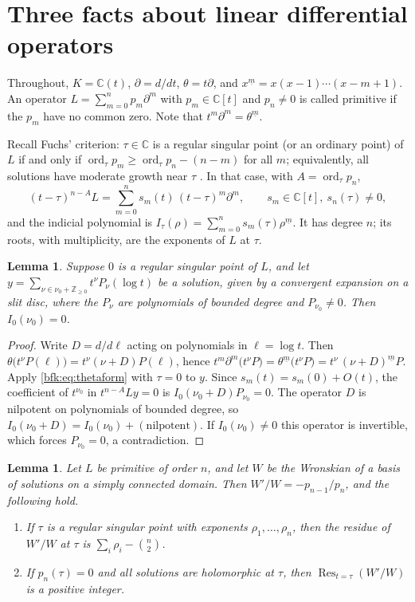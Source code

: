 \documentclass[11pt,a4paper]{article}
\newtheorem{lemma}[theorem]{Lemma}
\theoremstyle{definition}
\theoremstyle{remark}
\numberwithin{equation}{section}
\newcommand{\C}{\mathbb{C}}
\newcommand{\Z}{\mathbb{Z}}
\newcommand{\ff}[2]{#1^{\underline{#2}}}
\DeclareMathOperator{\ord}{ord}
\DeclareMathOperator{\Res}{Res}
\begin{document}
\section{Three facts about linear differential operators}\label{bfk:sec:ode}

Throughout, $K=\C(t)$, $\partial=d/dt$, $\theta=t\partial$, and $\ff{x}{m}=x(x-1)\cdots(x-m+1)$. An operator $L=\sum_{m=0}^{n}p_m\partial^m$ with $p_m\in\C[t]$ and $p_n\ne0$ is called primitive if the $p_m$ have no common zero. Note that $t^m\partial^m=\ff{\theta}{m}$.

Recall Fuchs' criterion: $\tau\in\C$ is a regular singular point (or an ordinary point) of $L$ if and only if $\ord_\tau p_m\ge \ord_\tau p_n-(n-m)$ for all $m$; equivalently, all solutions have moderate growth near $\tau$ \cite{Inc56,Was65}. In that case, with $A=\ord_\tau p_n$,
\begin{equation}\label{bfk:eq:thetaform}
(t-\tau)^{n-A}L=\sum_{m=0}^{n}s_m(t)\,(t-\tau)^m\partial^m,\qquad s_m\in\C[t],\ s_n(\tau)\ne0,
\end{equation}
and the indicial polynomial is $I_\tau(\rho)=\sum_{m=0}^{n}s_m(\tau)\ff{\rho}{m}$. It has degree $n$; its roots, with multiplicity, are the exponents of $L$ at $\tau$.

\begin{lemma}\label{bfk:lem:indicial}
Suppose $0$ is a regular singular point of $L$, and let $y=\sum_{\nu\in\nu_0+\Z_{\ge0}}t^{\nu}P_\nu(\log t)$ be a solution, given by a convergent expansion on a slit disc, where the $P_\nu$ are polynomials of bounded degree and $P_{\nu_0}\ne 0$. Then $I_0(\nu_0)=0$.
\end{lemma}

\begin{proof}
Write $D=d/d\ell$ acting on polynomials in $\ell=\log t$. Then $\theta\bigl(t^\nu P(\ell)\bigr)=t^\nu(\nu+D)P(\ell)$, hence $t^m\partial^m\bigl(t^\nu P\bigr)=\ff{\theta}{m}\bigl(t^\nu P\bigr)=t^\nu\,\ff{(\nu+D)}{m}P$. Apply \eqref{bfk:eq:thetaform} with $\tau=0$ to $y$. Since $s_m(t)=s_m(0)+O(t)$, the coefficient of $t^{\nu_0}$ in $t^{n-A}Ly=0$ is $I_0(\nu_0+D)P_{\nu_0}=0$. The operator $D$ is nilpotent on polynomials of bounded degree, so $I_0(\nu_0+D)=I_0(\nu_0)+(\text{nilpotent})$. If $I_0(\nu_0)\ne0$ this operator is invertible, which forces $P_{\nu_0}=0$, a contradiction.
\end{proof}

\begin{lemma}\label{bfk:lem:abel}
Let $L$ be primitive of order $n$, and let $W$ be the Wronskian of a basis of solutions on a simply connected domain. Then $W'/W=-p_{n-1}/p_n$, and the following hold.
\begin{enumerate}
\item[(a)] If $\tau$ is a regular singular point with exponents $\rho_1,\dots,\rho_n$, then the residue of $W'/W$ at $\tau$ is $\sum_i\rho_i-\binom n2$.
\item[(b)] If $p_n(\tau)=0$ and all solutions are holomorphic at $\tau$, then $\Res_{t=\tau}(W'/W)$ is a positive integer.
\end{enumerate}
\end{lemma}
\end{document}
